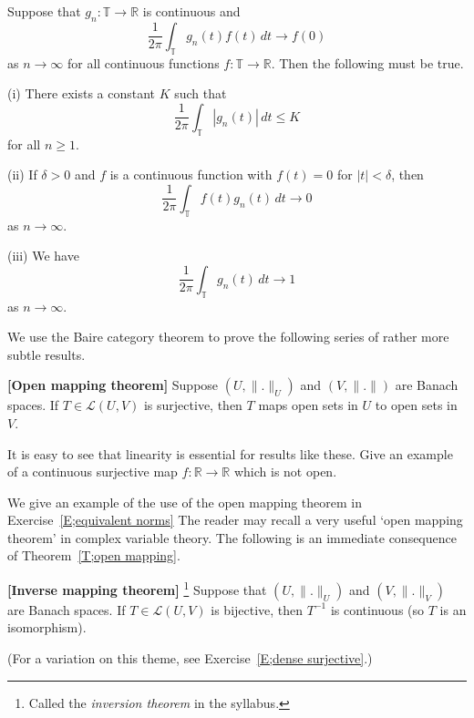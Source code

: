 \begin{exercise}\label{E;kernel 1} Suppose that 
$g_{n}:{\mathbb T}\rightarrow{\mathbb R}$
is continuous and
\[\frac{1}{2\pi}\int_{\mathbb T}g_{n}(t)f(t)\,dt 
\rightarrow f(0)\]
as
$n\rightarrow\infty$ for all continuous functions
$f:{\mathbb T}\rightarrow{\mathbb R}$. Then
the following must be true. 

(i) There exists a constant $K$
such that
\[\frac{1}{2\pi}\int_{\mathbb T}|g_{n}(t)|\,dt\leq K\]
for all $n\geq 1$.

(ii) If $\delta>0$ and $f$ is a continuous function
with $f(t)=0$ for $|t|<\delta$, then
\[\frac{1}{2\pi}\int_{\mathbb T}f(t)g_{n}(t)\,dt\rightarrow 0\] 
as $n\rightarrow \infty$.

(iii) We have
\[\frac{1}{2\pi}\int_{\mathbb T}g_{n}(t)\,dt\rightarrow 1\]
as $n\rightarrow\infty$.

\end{exercise}
We use the Baire category theorem to prove the following series
of rather more subtle results.
\begin{theorem}{\bf [Open mapping theorem]}\label{T;open mapping}
Suppose $(U,\|.\|_{U})$
and $(V,\|.\|)$ are Banach spaces. If $T\in{\mathcal L}(U,V)$
is surjective, then $T$ maps open sets in $U$ to open sets in $V$.
\end{theorem}
\begin{exercise} It is easy to see that linearity is essential
for results like these. Give an example of a continuous
surjective map $f:{\mathbb R}\rightarrow{\mathbb R}$
which is not open.
\end{exercise}

We give an example of the use of the open mapping theorem in
Exercise~\ref{E;equivalent norms} 
The reader may recall a very useful `open mapping theorem'
in complex variable theory. The following is an immediate
consequence of Theorem~\ref{T;open mapping}.
\begin{theorem}{\bf [Inverse mapping theorem]}\label{T:inverse}%
\footnote{Called the \emph{inversion theorem} in the syllabus.}
Suppose that $(U,\|.\|_{U})$
and $(V,\|.\|_{V})$ are Banach spaces. If $T\in{\mathcal L}(U,V)$
is bijective, then $T^{-1}$ is continuous (so $T$ is an isomorphism).
\end{theorem}
(For a variation on this theme, see Exercise~\ref{E;dense surjective}.)

